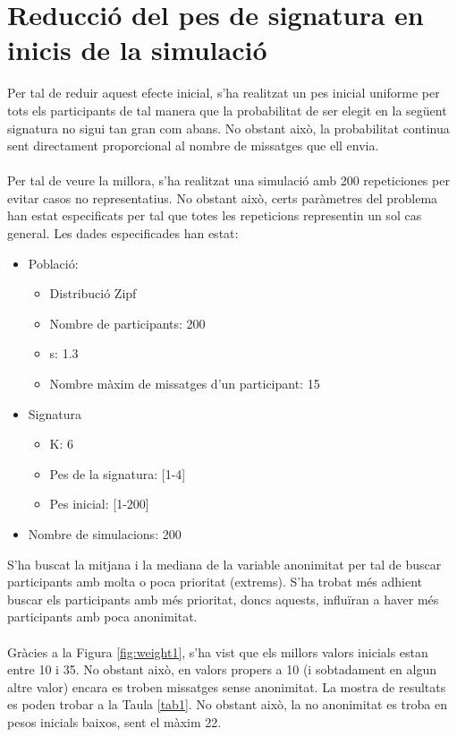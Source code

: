 \documentclass{article}
\begin{document}
\section{Reducció del pes de signatura en inicis de la simulació}
Per tal de reduir aquest efecte inicial, s'ha realitzat un pes inicial uniforme per tots els participants de tal manera que la probabilitat de ser elegit en la següent signatura no sigui tan gran com abans. No obstant això, la probabilitat continua sent directament proporcional al nombre de missatges que ell envia.
\\\\
Per tal de veure la millora, s'ha realitzat una simulació amb 200 repeticiones per evitar casos no representatius. No obstant això, certs paràmetres del problema han estat especificats per tal que totes les repeticions representin un sol cas general. Les dades especificades han estat:
\begin{itemize}
	\item Població:
	\begin{itemize}	
		\item Distribució Zipf
		\item Nombre de participants: 200
		\item s: 1.3
		\item Nombre màxim de missatges d'un participant: 15
	\end{itemize}
	\item Signatura
	\begin{itemize}
		\item K: 6
		\item Pes de la signatura: [1-4]
		\item Pes inicial: [1-200]
	\end{itemize}
\item Nombre de simulacions: 200
\end{itemize}
S'ha buscat la mitjana i la mediana de la variable anonimitat per tal de buscar participants amb molta o poca prioritat (extrems). S'ha trobat més adhient buscar els participants amb més prioritat, doncs aquests, influïran a haver més participants amb poca anonimitat.
\\
\\
Gràcies a la Figura \ref{fig:weight1}, s'ha vist que els millors valors inicials estan entre 10 i 35. No obstant això, en valors propers a 10 (i sobtadament en algun altre valor) encara es troben missatges sense anonimitat. La mostra de resultats es poden trobar a la Taula \ref{tab1}. No obstant això, la no anonimitat es troba en pesos inicials baixos, sent el màxim 22.
\end{document}
